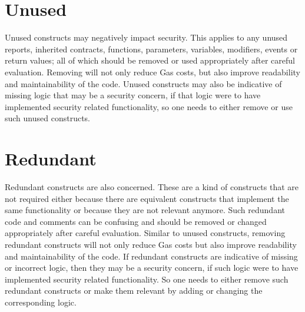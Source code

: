 \section{Unused}
Unused constructs may negatively impact security. This applies to any unused reports, inherited contracts, functions, parameters, variables, modifiers, events or return values; all of which should be removed or used appropriately after careful evaluation. Removing will not only reduce Gas costs, but also improve readability and maintainability of the code. Unused constructs may also be indicative of missing logic that may be a security concern, if that logic were to have implemented security related functionality, so one needs to either remove or use such unused constructs.

\section{Redundant}
Redundant constructs are also concerned. These are a kind of constructs that are not required either because there are equivalent constructs that implement the same functionality or because they are not relevant anymore. Such redundant code and comments can be confusing and should be removed or changed appropriately after careful evaluation. Similar to unused constructs, removing redundant constructs will not only reduce Gas costs but also improve readability and maintainability of the code. If redundant constructs are indicative of missing or incorrect logic, then they may be a security concern, if such logic were to have implemented security related functionality. So one needs to either remove such redundant constructs or make them relevant by adding or changing the corresponding logic.

